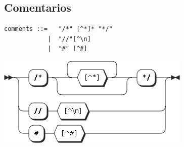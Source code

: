 \subsection{Comentarios}
\begin{multicols}{2}
\begin{lstlisting}[style=nonumbers]      
comments ::=   "/*" [^*]* "*/"
            |  "//"[^\n]
            |  "#" [^#]
\end{lstlisting}  
\columnbreak	
\begin{center}
\includegraphics[scale=0.4]{diagram/comments.png} \\
\end{center}
\end{multicols}




